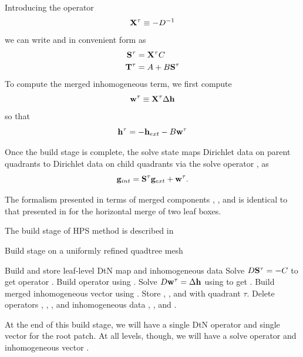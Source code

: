 Introducing  the operator
\begin{equation}
\mathbf X^{\tau} \equiv -D^{-1}
\label{eq:xtau}
\end{equation}
we can write \Ttau and  \Stau in convenient form as
\begin{equation}
\begin{aligned}
\mathbf S^{\tau} & = \mathbf X^{\tau} C \\
\mathbf T^{\tau} & = A + B\mathbf S^{\tau} \\
\label{eq:stau_ttau}
\end{aligned}
\end{equation}
To compute the merged inhomogeneous term, we first compute
\begin{equation}
\mathbf w^{\tau} \equiv \mathbf X^{\tau}\Delta \mathbf h
\label{eq:wtau}
\end{equation}
so that
\begin{equation}
\mathbf h^{\tau} = -\mathbf h_{ext} - B\mathbf w^{\tau}
\label{eq:htau}
\end{equation}

Once the build stage is complete, the solve state maps Dirichlet data on parent quadrants to Dirichlet data on child quadrants via the solve operator \Stau, as
\begin{equation}
\mathbf g_{int} = \mathbf S^{\tau} \mathbf g_{ext} + \mathbf w^{\tau}.
\label{eq:solve_eqn}
\end{equation}

The formalism presented in terms of merged components \Xtau, \Stau, \Ttau and \htau is identical to that presented in \cite{martinsson2015hierarchical} for the horizontal merge of two leaf boxes.

The build stage of HPS method is described in 
\begin{algorithm}[H]
    \caption{Build stage on a uniformly refined quadtree mesh}
    \begin{algorithmic}[0]
         
                \State Build and store leaf-level DtN map \Ttau and inhomogeneous data \htau
            \Else {}
                \State Solve $D\mathbf S^{\tau} = -C$ to get operator \Stau. 
                \State Build operator \Ttau using .      
                \State Solve $D\mathbf w^{\tau} = \Delta \mathbf h$ using to get \wtau.  
                \State Build merged inhomogeneous vector \htau using .
                \State Store \Stau, \Ttau, \htau and \wtau with quadrant $\tau$.
                \State Delete operators \Talpha, \Tbeta, \Tgamma, \Tomega and inhomogeneous data \halpha, \hbeta, \hgamma and \homega.
            \EndIf
        \EndFor
    \end{algorithmic}
    \label{alg:build_merge_uniform}
\end{algorithm}
At the end of this build stage, we will have a single DtN operator \Ttau and single vector \htau for the root patch.  At all levels, though, we will have a solve operator \Stau and inhomogeneous vector \wtau.


